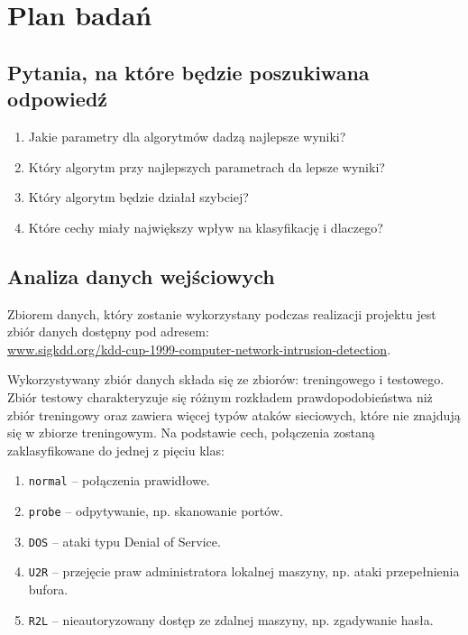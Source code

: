 \documentclass[a4paper, 12pt]{article}
\begin{document}
\section{Plan badań}

\subsection{Pytania, na które będzie poszukiwana odpowiedź}

\begin{enumerate}
 \item Jakie parametry dla algorytmów dadzą najlepsze wyniki?
 \item Który algorytm przy najlepszych parametrach da lepsze wyniki?
 \item Który algorytm będzie działał szybciej?
 \item Które cechy miały największy wpływ na klasyfikację i dlaczego?
\end{enumerate}

\subsection{Analiza danych wejściowych}

Zbiorem danych, który zostanie wykorzystany podczas realizacji projektu jest zbiór danych dostępny 
pod adresem: \\
\url{www.sigkdd.org/kdd-cup-1999-computer-network-intrusion-detection}.

Wykorzystywany zbiór danych składa się ze zbiorów: treningowego i testowego. 
Zbiór testowy charakteryzuje się różnym rozkładem prawdopodobieństwa niż zbiór treningowy oraz 
zawiera więcej typów ataków sieciowych, które nie znajdują się w zbiorze treningowym.
Na podstawie cech, połączenia zostaną zaklasyfikowane do jednej z pięciu klas:

\begin{enumerate}
 \item \texttt{normal} -- połączenia prawidłowe.
 \item \texttt{probe} -- odpytywanie, np. skanowanie portów.
 \item \texttt{DOS} -- ataki typu Denial of Service.
 \item \texttt{U2R} -- przejęcie praw administratora lokalnej maszyny, np. ataki przepełnienia bufora.
 \item \texttt{R2L} -- nieautoryzowany dostęp ze zdalnej maszyny, np. zgadywanie hasła.
\end{enumerate}
\end{document}
